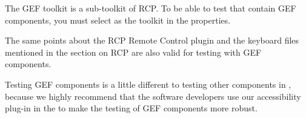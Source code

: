 The GEF toolkit is a sub-toolkit of RCP. To be able to test \gdauts{} that contain GEF components, you must select  as the toolkit in the \gdproject{} properties. 

The same points about the RCP Remote Control plugin and the keyboard files mentioned in the section on RCP \gdauts{}  are also valid for testing \gdauts{} with GEF components. 

Testing GEF components is a little different to testing other components in \app{}, because we highly recommend that the software developers use our accessibility plug-in in the \gdaut{} to make the testing of GEF components more robust. 

